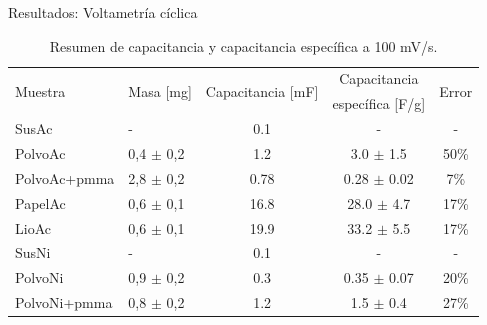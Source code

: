 \documentclass[aspectratio=169]{beamer}
\newcommand{\mSustratoAcero}{SusAc }
\newcommand{\mPolvoAcero}{PolvoAc }
\newcommand{\mPolvoAceroPMMA}{PolvoAc+pmma }
\newcommand{\mPapelAcero}{PapelAc }
\newcommand{\mLiofilizadoAcero}{LioAc }
\newcommand{\mSustratoNiquel}{SusNi }
\newcommand{\mPolvoNiquel}{PolvoNi }
\newcommand{\mPolvoNiquelPMMA}{PolvoNi+pmma }
\begin{document}
	\begin{frame}{Resultados: Voltametría cíclica}
		\begin{table}[h!]
			\centering
			\begin{tabular}{ l l c c c }
				\multirow{2}{*}{Muestra}& \multirow{2}{*}{Masa [mg]}& \multirow{2}{*}{Capacitancia [mF]}	& Capacitancia & \multirow{2}{*}{Error}\\
				&         			      & 										& específica [F/g]     &			\\
				\hline
				\mSustratoAcero		&  -            &			0.1			&	-				&	-		\\
				\mPolvoAcero		& 0,4 $\pm$ 0,2 &			1.2			&	3.0	$\pm$ 1.5	&	50\%	\\
				\mPolvoAceroPMMA	& 2,8 $\pm$ 0,2 &			0.78		&	0.28 $\pm$ 0.02	&	7\%		\\
				\rowcolor{samplegreen}
				\mPapelAcero		& 0,6 $\pm$ 0,1 &			16.8		&	28.0 $\pm$ 4.7	&	17\%	\\
				\rowcolor{samplegreen}
				\mLiofilizadoAcero	& 0,6 $\pm$ 0,1 &			19.9		&	33.2 $\pm$ 5.5	&	17\%	\\
				\mSustratoNiquel	&    -          &			0.1			&	- 				&	-		\\
				\mPolvoNiquel		& 0,9 $\pm$ 0,2 &			0.3			&	0.35 $\pm$ 0.07	&	20\%	\\
				\mPolvoNiquelPMMA	& 0,8 $\pm$ 0,2 &			1.2			&	1.5	$\pm$ 0.4	&	27\%	\\
			\end{tabular}                                                          
			\label{tab:resumen_capacitancia}
			\caption{Resumen de capacitancia y capacitancia específica a 100 mV/s.}
		\end{table}
	\end{frame}
\end{document}

